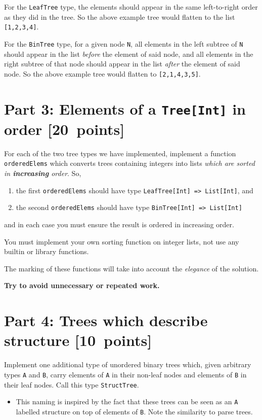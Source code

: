 \documentclass[11pt]{article}
\begin{document}
For the \texttt{LeafTree} type, the elements should appear in the same
left-to-right order as they did in the tree.
So the above example tree would flatten to the list \texttt{[1,2,3,4]}.

For the \texttt{BinTree} type, for a given node \texttt{N},
all elements in the left subtree of \texttt{N}
should appear in the list \emph{before} the element of said node, and
all elements in the right subtree of that node
should appear in the list \emph{after} the element of said node.
So the above example tree would flatten to \texttt{[2,1,4,3,5]}.

\section*{Part 3: Elements of a \texttt{Tree[Int]} in order   [20 points]}
\label{sec:orga2360fd}
For each of the two tree types we have implemented, implement
a function \texttt{orderedElems} which converts trees containing integers
into lists \emph{which are sorted in \textbf{increasing} order}. So,
\begin{enumerate}
\item the first \texttt{orderedElems} should have type \texttt{LeafTree[Int] => List[Int]}, and
\item the second \texttt{orderedElems} should have type \texttt{BinTree[Int] => List[Int]}
\end{enumerate}
and in each case you must ensure the result is ordered
in increasing order.

You must implement your own sorting function on integer lists,
not use any builtin or library functions.

The marking of these functions will take into account
the \emph{elegance} of the solution.
\begin{center}
\textbf{Try to avoid unnecessary or repeated work.}
\end{center}

\section*{Part 4: Trees which describe structure     [10 points]}
\label{sec:orgaeba83e}
Implement one additional type of unordered binary trees which,
given arbitrary types \texttt{A} and \texttt{B},
carry elements of \texttt{A} in their non-leaf nodes
and elements of \texttt{B} in their leaf nodes.
Call this type \texttt{StructTree}.
\begin{itemize}
\item This naming is inspired by the fact that these trees
can be seen as an \texttt{A} labelled structure
on top of elements of \texttt{B}.
Note the similarity to parse trees.
\end{itemize}
\end{document}
